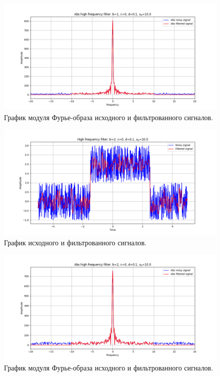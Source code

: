 \documentclass[a4paper, 12pt]{article}
\begin{document}
    \begin{figure}[!htb]
        \centering
        \includegraphics[scale=0.485]{2_abs_u_U_nohigh.png}
        \captionsetup{skip=0pt}
        \caption{График модуля Фурье-образа исходного и фильтрованного сигналов.}
        \label{fig:fig4}
    \end{figure}
    \begin{figure}[!htb]
        \centering
        \includegraphics[scale=0.485]{3_u_flt_u_nohigh.png}
        \captionsetup{skip=0pt}
        \caption{График исходного и фильтрованного сигналов.}
        \label{fig:fig5}
    \end{figure}
    \begin{figure}[!htb]
        \centering
        \includegraphics[scale=0.485]{3_abs_u_U_nohigh.png}
        \captionsetup{skip=0pt}
        \caption{График модуля Фурье-образа исходного и фильтрованного сигналов.}
        \label{fig:fig6}
    \end{figure}
\end{document}
